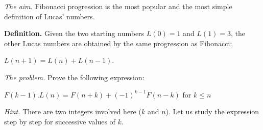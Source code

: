 {\noindent \textit{The aim.}
Fibonacci progression is the most popular and the most simple definition of Lucas' numbers.
\medskip

\textbf{Definition.}
Given the two starting numbers $L(0) = 1$ and $L(1) = 3$, 
the other Lucas numbers are obtained by the same progression as Fibonacci: 

$L(n+1) = L(n)+L(n-1)$.
\medskip

%
%

\noindent \textit{The problem.}
Prove the following expression:

$F(k-1).L(n) = F(n+k)+ (-1)^{k-1}F(n-k)$ for $k \leq n$
\bigskip

\noindent \textit{Hint.} 
There are two integers involved here ($k$ and $n$).
Let us study the expression step by step for successive values of $k$.
\medskip

%
%
%
%
%
%
%
%
%
%
%
%

}
